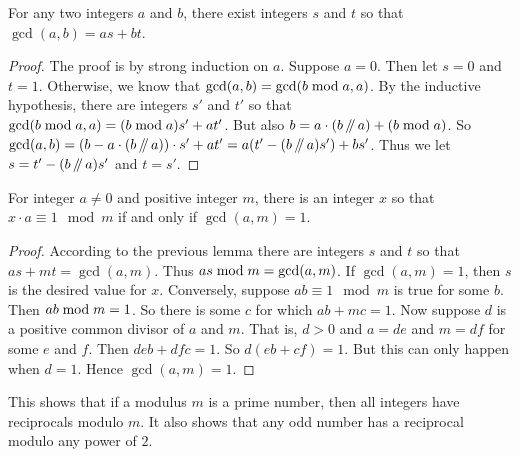 \begin{lem}
	For any two integers $a$ and $b$, there exist integers $s$ and $t$ so that $\gcd(a,b)=as+bt$.
	
	\begin{proof}
		The proof is by strong induction on $a$. 
		Suppose $a=0$.
		Then let $s=0$ and $t=1$. Otherwise, we know that $\gcd(a,b)=\gcd(b\bmod a, a)$. By the inductive hypothesis, there are integers $s'$ and $t'$
		so that $\gcd(b\bmod a, a)= (b\bmod a)s'+at'$. But also $b = a\cdot(b\mathop{/\mkern-5mu/} a)+(b\bmod a)$.
		So $\gcd(a,b) = (b-a\cdot(b\mathop{/\mkern-5mu/} a))\cdot s' + at'= a(t'-(b\mathop{/\mkern-5mu/} a)s') + bs'$. Thus we let $s=t'-(b\mathop{/\mkern-5mu/} a)s'$ and $t=s'$.
	\end{proof}
\end{lem}



\begin{thm}
	For integer $a\neq 0$ and positive integer $m$, there is an integer $x$ so that $x\cdot a\equiv 1\mod m$ if and only if $\gcd(a,m)=1$.
	
	\begin{proof}
		According to the previous lemma there are integers $s$ and $t$ so that $as+mt = \gcd(a,m)$. Thus $as\bmod m = \gcd(a,m)$.
		If $\gcd(a,m)=1$, then $s$ is the desired value for $x$.
		Conversely, suppose $ab\equiv 1\mod m$ is true for some $b$. Then
		$ab\bmod m = 1$. So there is some $c$ for which $ab + mc = 1$.
		Now suppose $d$ is a positive common divisor of $a$ and $m$. That is, $d>0$ and
		$a = de$ and $m = df$ for some $e$ and $f$. Then $deb + dfc = 1$. So
		$d(eb + cf) = 1$. But this can only happen when $d=1$. Hence $\gcd(a,m)=1$.
	\end{proof}
\end{thm}

This shows that if a modulus $m$ is a prime number, then all integers have reciprocals modulo $m$. It also shows that any odd number has a reciprocal modulo any power of $2$. 